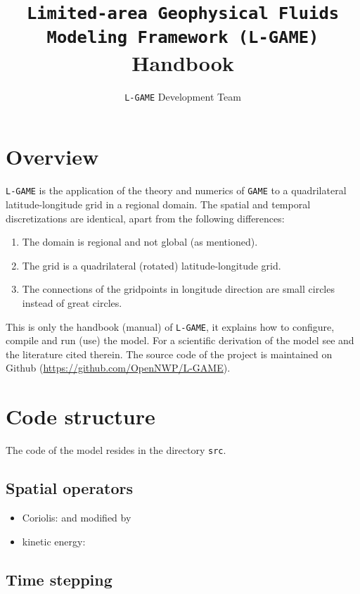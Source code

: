 \documentclass[10pt]{report}
\title{\texttt{Limited-area Geophysical Fluids Modeling Framework (L-GAME)} Handbook}
\author{\texttt{L-GAME} Development Team}
\date{}
\begin{document}
\maketitle

\tableofcontents

\chapter{Overview}
\label{chap:overview}

\texttt{L-GAME} is the application of the theory and numerics of \texttt{GAME} to a quadrilateral latitude-longitude grid in a regional domain. The spatial and temporal discretizations are identical, apart from the following differences:
%
\begin{enumerate}
\item The domain is regional and not global (as mentioned).
\item The grid is a quadrilateral (rotated) latitude-longitude grid.
\item The connections of the gridpoints in longitude direction are small circles instead of great circles.
\end{enumerate}
%
This is only the handbook (manual) of \texttt{L-GAME}, it explains how to configure, compile and run (use) the model. For a scientific derivation of the model see \cite{kompendium} and the literature cited therein. The source code of the project is maintained on Github (\url{https://github.com/OpenNWP/L-GAME}).

\chapter{Code structure}
\label{chap:code_structure}

The code of the model resides in the directory \texttt{src}.

\section{Spatial operators}
\label{sec:spatial_operators}

\begin{itemize}
\item Coriolis: \cite{thuburn_f_discrete_plane} and \cite{ringler_trsk} modified by \cite{doi:10.1002/qj.3294}
\item kinetic energy: \cite{doi:10.1002/qj.1960}
\end{itemize}

\section{Time stepping}
\label{sec:time_stepping}
\end{document}
